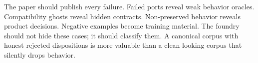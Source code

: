 The paper should publish every failure. Failed ports reveal weak behavior oracles. Compatibility ghosts reveal hidden contracts. Non-preserved behavior reveals product decisions. Negative examples become training material. The foundry should not hide these cases; it should classify them. A canonical corpus with honest rejected dispositions is more valuable than a clean-looking corpus that silently drops behavior.

